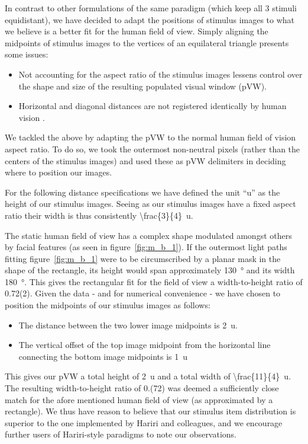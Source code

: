 	In contrast to other formulations\citep{Hariri2000,Hariri2003} of the same paradigm (which keep all 3 stimuli equidistant),
	we have decided to adapt the positions of stimulus images to what we believe is a better fit for the human field of view.
	Simply aligning the midpoints of stimulus images to the vertices of an equilateral triangle presents some issues:
	\begin{itemize}
	    \item Not accounting for the aspect ratio of the stimulus images lessens control over the shape and size of the resulting populated visual window (pVW).
	    \item Horizontal and diagonal distances are not registered identically by human vision \citep{TerryBahill1975}.
	\end{itemize}
	
	We tackled the above by adapting the pVW to the normal human field of vision aspect ratio.
	To do so, we took the outermost non-neutral pixels (rather than the centers of the stimulus images) and used these as pVW delimiters in deciding where to position our images.
	
	For the following distance specifications we have defined the unit “u” as the height of our stimulus images.
	Seeing as our stimulus images have a fixed aspect ratio their width is thus consistently \SI[parse-numbers = false]{\frac{3}{4}}{u}.
	
	The static human field of view has a complex shape modulated amongst others by facial features (as seen in figure~\ref{fig:m_b_1}).
	If the outermost light paths fitting figure~\ref{fig:m_b_1} were to be circumscribed by a planar mask in the shape of the rectangle, its height would span approximately \SI{130}{\degree} and its width \SI{180}{\degree}.
	This gives the rectangular fit for the field of view a width-to-height ratio of 0.72(2).
	Given the data - and for numerical convenience - we have chosen to position the midpoints of our stimulus images as follows:
	\begin{itemize}
	    \item The distance between the two lower image midpoints is \SI{2}{u}.
	    \item The vertical offset of the top image midpoint from the horizontal line connecting the bottom image midpoints is \SI{1}{u}
	\end{itemize}
	This gives our pVW a total height of \SI{2}{u} and a total width of \SI[parse-numbers = false]{\frac{11}{4}}{u}.
	The resulting width-to-height ratio of 0.(72) was deemed a sufficiently close match for the afore mentioned human field of view (as approximated by a rectangle).
	We thus have reason to believe that our stimulus item distribution is superior to the one implemented by Hariri and colleagues, and we encourage further users of Hariri-style paradigms to note our observations.  
	
